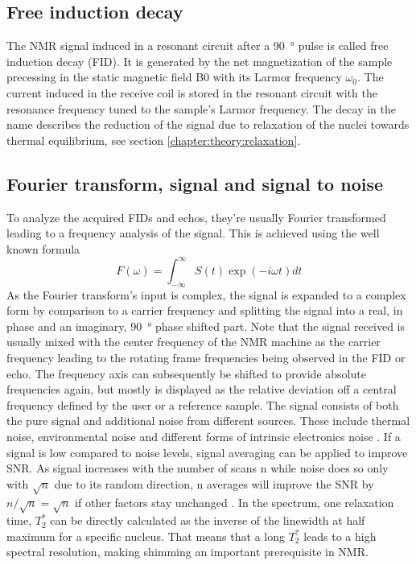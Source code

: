         \subsection{Free induction decay}
        The NMR signal induced in a resonant circuit after a \SI{90}{\degree} pulse is called free induction decay (FID). It is generated by the net magnetization of the sample precessing in the static magnetic field B0 with its Larmor frequency $\omega_0$. The current induced in the receive coil is stored in the resonant circuit with the resonance frequency tuned to the sample's Larmor frequency. The decay in the name describes the reduction of the signal due to relaxation of the nuclei towards thermal equilibrium, see section \ref{chapter:theory:relaxation}.
        \subsection{Fourier transform, signal and signal to noise}
        \label{chapter:theory:fourierTransform}
        To analyze the acquired FIDs and echos, they're usually Fourier transformed leading to a frequency analysis of the signal. This is achieved using the well known formula \cite{farrar_pulse_2012}
            \begin{equation}
                F(\omega) = \int^{\infty}_{-\infty}S(t) \exp(-i\omega t)dt
            \end{equation}
            As the Fourier transform's input is complex, the signal is expanded to a complex form by comparison to a carrier frequency and splitting the signal into a real, in phase and an imaginary, \SI{90}{\degree} phase shifted part.
            Note that the signal received is usually mixed with the center frequency of the NMR machine as the carrier frequency leading to the rotating frame frequencies being observed in the FID or echo. The frequency axis can subsequently be shifted to provide absolute frequencies again, but mostly is displayed as the relative deviation off a central frequency defined by the user or a reference sample.
            The signal consists of both the pure signal and additional noise from different sources. These include thermal noise, environmental noise and different forms of intrinsic electronics noise \cite{noauthor_henry_nodate}.
            If a signal is low compared to noise levels, signal averaging can be applied to improve SNR. As signal increases with the number of scans n while noise does so only with $\sqrt n$ due to its random direction, n averages will improve the SNR by $n/\sqrt{n} = \sqrt{n}$ if other factors stay unchanged \cite{edelstein_intrinsic_1986}.
            In the spectrum, one relaxation time, $T_2^*$ can be directly calculated as the inverse of the linewidth at half maximum for a specific nucleus. That means that a long $T_2^*$ leads to a high spectral resolution, making shimming an important prerequisite in NMR.
